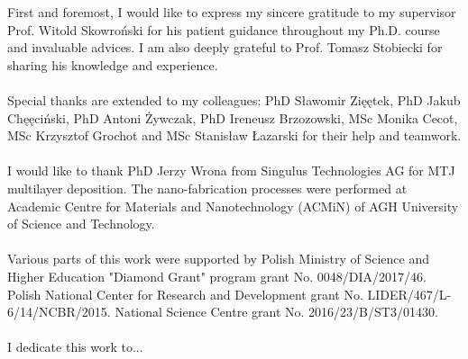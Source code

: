 \begin{acknowledgements}

\noindent First and foremost, I would like to express my sincere gratitude to my supervisor Prof. Witold Skowroński for his patient guidance throughout my Ph.D. course and invaluable advices. I am also deeply grateful to Prof. Tomasz Stobiecki  for sharing his knowledge and experience.\\
\\
Special thanks are extended to my colleagues: PhD Sławomir Zi\ifmmode \mbox{\k{e}}\else \k{e}\fi{}tek, PhD Jakub Ch\ifmmode \mbox{\k{e}}\else \k{e}\fi{}ciński, PhD Antoni Żywczak, PhD Ireneusz Brzozowski, MSc Monika Cecot, MSc Krzysztof Grochot and MSc Stanisław Łazarski for their help and teamwork.
\\
\\
I would like to thank PhD Jerzy Wrona from Singulus Technologies AG for MTJ multilayer deposition. The nano-fabrication processes were performed at Academic Centre for Materials and Nanotechnology (ACMiN) of AGH University of Science and Technology.
\\
\\
Various parts of this work were supported by
Polish Ministry of Science and Higher Education "Diamond Grant" program grant No. 0048/DIA/2017/46.
Polish National Center for Research and Development grant No. LIDER/467/L-6/14/NCBR/2015.
National Science Centre grant No. 2016/23/B/ST3/01430.
\\
\\
I dedicate this work to...

\end{acknowledgements}